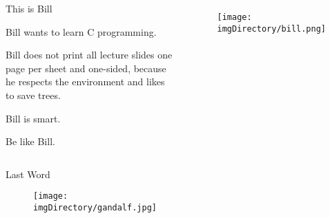 \documentclass[compress]{beamer}
\begin{document}
\begin{slide}
	\begin{columns}
	\begin{block}{This is Bill}

	Bill wants to learn C programming.

	Bill does not print all lecture slides one page per sheet and one-sided, because he respects the environment and likes to save trees.

	Bill is smart.

	Be like Bill.

	\end{block}
	\begin{figure}
	\texttt{[image: \\imgDirectory/bill.png]}
	\end{figure}
	\end{columns}
\end{slide}

\begin{slide}
	\begin{block}{Last Word}

	\begin{figure}
	\texttt{[image: \\imgDirectory/gandalf.jpg]}
	\end{figure}

	\end{block}
\end{slide}
\end{document}
